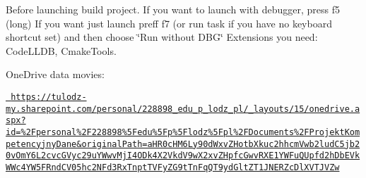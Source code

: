 Before launching build project. If you want to launch with debugger, press f5 (long) If you want just launch preff f7 (or run task if you have no keyboard shortcut set) and then choose \char`\"{}\+Run without DBG\char`\"{} Extensions you need\+: Code\+LLDB, Cmake\+Tools.

One\+Drive data movies\+:

\href{https://tulodz-my.sharepoint.com/personal/228898_edu_p_lodz_pl/_layouts/15/onedrive.aspx?id=\%2Fpersonal\%2F228898\%5Fedu\%5Fp\%5Flodz\%5Fpl\%2FDocuments\%2FProjektKompetencyjnyDane&originalPath=aHR0cHM6Ly90dWxvZHotbXkuc2hhcmVwb2ludC5jb20vOmY6L2cvcGVyc29uYWwvMjI4ODk4X2VkdV9wX2xvZHpfcGwvRXE1YWFuQUpfd2hDbEVkWWc4YW5FRndCV05hc2NFd3RxTnptTVFyZG9tTnFqQT9ydGltZT1JNERZcDlXVTJVZw}{\texttt{ https\+://tulodz-\/my.\+sharepoint.\+com/personal/228898\+\_\+edu\+\_\+p\+\_\+lodz\+\_\+pl/\+\_\+layouts/15/onedrive.\+aspx?id=\%2\+Fpersonal\%2\+F228898\%5\+Fedu\%5\+Fp\%5\+Flodz\%5\+Fpl\%2\+FDocuments\%2\+FProjekt\+Kompetencyjny\+Dane\&original\+Path=a\+HR0c\+HM6\+Ly90d\+Wxv\+ZHotb\+Xkuc2hhcm\+Vwb2lud\+C5jb20v\+Om\+Y6\+L2cvc\+GVyc29u\+YWwv\+Mj\+I4\+ODk4\+X2\+Vkd\+V9w\+X2xv\+ZHpfc\+Gwv\+RXE1\+YWFu\+QUpfd2h\+Db\+EVk\+WWc4\+YW5\+FRnd\+CV05hc2\+NFd3\+Rx\+Tnpt\+TVFy\+ZG9t\+Tn\+Fq\+QT9yd\+Glt\+ZT1\+JNERZc\+Dl\+XVTJVZw}} 